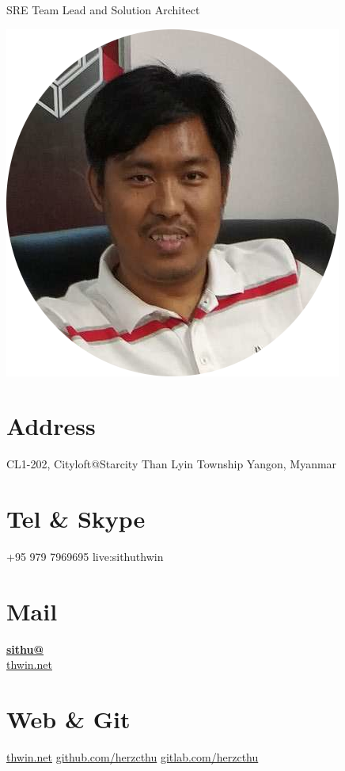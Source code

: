 \documentclass[]{friggeri-cv}
\begin{document}
      {SRE Team Lead and Solution Architect}


\begin{aside}
  \includegraphics[scale=1]{img/myself-circle.png}
  \section{Address}
    CL1-202, Cityloft@Starcity
    Than Lyin Township
    Yangon, Myanmar
    ~
  \section{Tel \& Skype}
    +95 979 7969695
    live:sithuthwin
    ~
  \section{Mail}
    \href{mailto:sithu@thwin.net}{\textbf{sithu@}\\thwin.net}
    ~
  \section{Web \& Git}
    \href{https://www.thwin.net}{thwin.net}
    \href{https://github.com/herzcthu}{github.com/herzcthu}
    \href{https://gitlab.com/herzcthu}{gitlab.com/herzcthu}
    ~

\end{aside}
\end{document}
